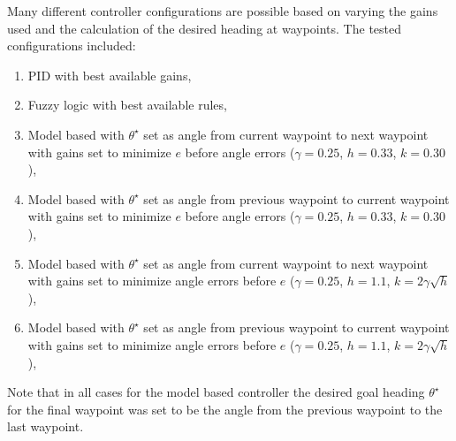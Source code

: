 Many different controller configurations are possible based on varying the gains used and the calculation of the desired heading at waypoints. The tested configurations included:
\begin{enumerate}
\item PID with best available gains,
\item Fuzzy logic with best available rules,
\item Model based with $\theta^\star$ set as angle from current waypoint to next waypoint with gains set to minimize $e$ before angle errors ($\gamma = 0.25$, $h = 0.33$, $k = 0.30$),
\item Model based with $\theta^\star$ set as angle from previous waypoint to current waypoint with gains set to minimize $e$ before angle errors ($\gamma = 0.25$, $h = 0.33$, $k = 0.30$),
\item Model based with $\theta^\star$ set as angle from current waypoint to next waypoint with gains set to minimize angle errors before $e$ ($\gamma = 0.25$, $h = 1.1$, $k = 2\gamma\sqrt{h}$),
\item Model based with $\theta^\star$ set as angle from previous waypoint to current waypoint with gains set to minimize angle errors before $e$ ($\gamma = 0.25$, $h = 1.1$, $k = 2\gamma\sqrt{h}$),
\end{enumerate}
Note that in all cases for the model based controller the desired goal heading $\theta^\star$ for the final waypoint was set to be the angle from the previous waypoint to the last waypoint.

